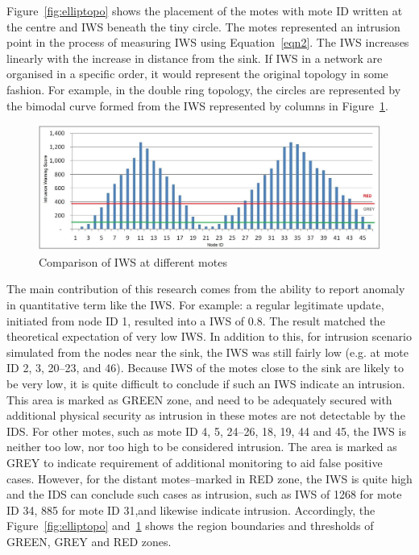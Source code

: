 \documentclass[conference]{IEEEtran}
\begin{document}
Figure~\ref{fig:elliptopo} shows the placement of the motes with mote ID written at the centre and IWS beneath the tiny circle.
The motes represented an intrusion point in the process of measuring IWS using Equation~\ref{eqn2}.
The IWS increases linearly with the increase in distance from the sink.
If IWS in a network are organised in a specific order, it would represent the original topology in some fashion.
For example, in the double ring topology, the circles are represented by the bimodal curve formed from the IWS represented by columns in Figure~\ref{fig:ellipgraph}.
\begin{figure}[tbph!]
	\centering
        \includegraphics[width=\linewidth]{DR_Column}
        \caption{Comparison of IWS at different motes}
        \label{fig:ellipgraph}
\end{figure}

The main contribution of this research comes from the ability to report anomaly in quantitative term like the IWS.
For example:  a regular legitimate update, initiated from node ID 1, resulted into a IWS of 0.8.
The result matched the theoretical expectation of very low IWS.
In addition to this, for intrusion scenario simulated from the nodes near the sink, the IWS was still fairly low (e.g. at mote ID 2, 3, 20--23, and 46). 
Because IWS of the motes close to the sink are likely to be very low, it is quite difficult to conclude if such an IWS indicate an intrusion.
This area is marked as GREEN zone, and need to be adequately secured with additional physical security as intrusion in these motes are not detectable by the IDS.
For other motes, such as mote ID 4, 5, 24--26, 18, 19, 44 and 45, the IWS is neither too low, nor too high to be considered intrusion. The area is marked as GREY to indicate requirement of additional monitoring to aid false positive cases.
However, for the distant motes--marked in RED zone, the IWS is quite high and the IDS can conclude such cases as intrusion, such as IWS of 1268 for mote ID 34, 885 for mote ID 31,and likewise indicate intrusion.
Accordingly, the Figure~\ref{fig:elliptopo} and~\ref{fig:ellipgraph} shows the region boundaries and thresholds of GREEN, GREY and RED zones.%
\end{document}
